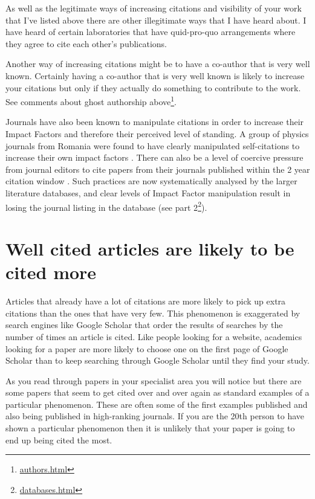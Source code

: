 \documentclass[
]{krantz}
\renewcommand{\href}[2]{#2\footnote{\url{#1}}}
\begin{document}
As well as the legitimate ways of increasing citations and visibility of your work that I've listed above there are other illegitimate ways that I have heard about. I have heard of certain laboratories that have quid-pro-quo arrangements where they agree to cite each other's publications.

Another way of increasing citations might be to have a co-author that is very well known. Certainly having a co-author that is very well known is likely to increase your citations but only if they actually do something to contribute to the work. See comments about \href{authors.html}{ghost authorship above}.

Journals have also been known to manipulate citations in order to increase their Impact Factors and therefore their perceived level of standing. A group of physics journals from Romania were found to have clearly manipulated self-citations to increase their own impact factors \citep[see][]{heneberg2016excessive}. There can also be a level of coercive pressure from journal editors to cite papers from their journals published within the 2 year citation window \citep{chorus2016large-scale}. Such practices are now systematically analysed by the larger literature databases, and clear levels of Impact Factor manipulation result in losing the journal listing in the database (\href{databases.html}{see part 2}).

\hypertarget{well-cited-articles-are-likely-to-be-cited-more}{%
\section{Well cited articles are likely to be cited more}\label{well-cited-articles-are-likely-to-be-cited-more}}

Articles that already have a lot of citations are more likely to pick up extra citations than the ones that have very few. This phenomenon is exaggerated by search engines like Google Scholar that order the results of searches by the number of times an article is cited. Like people looking for a website, academics looking for a paper are more likely to choose one on the first page of Google Scholar than to keep searching through Google Scholar until they find your study.

As you read through papers in your specialist area you will notice but there are some papers that seem to get cited over and over again as standard examples of a particular phenomenon. These are often some of the first examples published and also being published in high-ranking journals. If you are the 20th person to have shown a particular phenomenon then it is unlikely that your paper is going to end up being cited the most.
\end{document}

